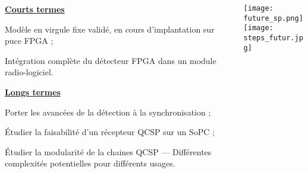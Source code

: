 \documentclass[../main.tex]{subfiles}
\begin{document}
\begin{frame}{\subsecname}
  \begin{columns}
    \begin{column}{.7 \linewidth}
      {\centering \underline{\textbf{Courts termes}}\par}
      \begin{ctrlitemize}{.6 em}
        \item Modèle en virgule fixe validé, en cours d'implantation sur puce FPGA ;
        \item Intégration complète du détecteur FPGA dans un module radio-logiciel.
      \end{ctrlitemize}

      {\centering \underline{\textbf{Longs termes}}\par}
      \begin{ctrlitemize}{.6 em}
        \item Porter les avancées de la détection à la synchronisation ;
        \item Étudier la faisabilité d'un récepteur QCSP sur un SoPC ;
        \item Étudier la modularité de la chaines QCSP --- Différentes complexités potentielles pour différents usages.
      \end{ctrlitemize}
    \end{column}
    \begin{column}{.3 \linewidth}
      \hfill \texttt{[image: future\_sp.png]} \\
      \texttt{[image: steps\_futur.jpg]}
    \end{column}
  \end{columns}
\end{frame}
\end{document}
